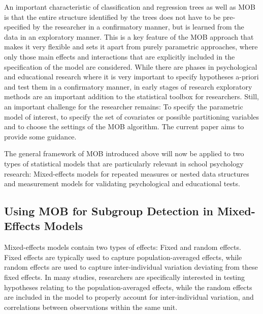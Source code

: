 \documentclass[doc,floatsintext,natbib]{apa7}
\begin{document}
An important characteristic of classification and regression trees as well as MOB is that the entire structure identified by the trees does not have to be pre-specified by the researcher in a confirmatory manner, but is learned from the data in an exploratory manner. This is a key feature of the MOB approach that makes it very flexible and sets it apart from purely parametric approaches, where only those main effects and interactions that are explicitly included in the specification of the model are considered. While there are phases in psychological and educational research where it is very important to specify hypotheses a-priori and test them in a confirmatory manner, in early stages of research exploratory methods are an important addition to the statistical toolbox for researchers. Still, an important challenge for the researcher remains: To specify the parametric model of interest, to specify the set of covariates or possible partitioning variables and to choose the settings of the MOB algorithm. The current paper aims to provide some guidance. 

The general framework of MOB introduced above will now be applied to two types of statistical models that are particularly relevant in school psychology research: Mixed-effects models for repeated measures or nested data structures and measurement models for validating psychological and educational tests. 

\subsection{Using MOB for Subgroup Detection in Mixed-Effects Models}

Mixed-effects models contain two types of effects: Fixed and random effects. Fixed effects are typically used to capture population-averaged effects, while random effects are used to capture inter-individual variation deviating from these fixed effects. In many studies, researchers are specifically interested in testing hypotheses relating to the population-averaged effects, while the random effects are included in the model to properly account for inter-individual variation, and correlations between observations within the same unit.
\end{document}
